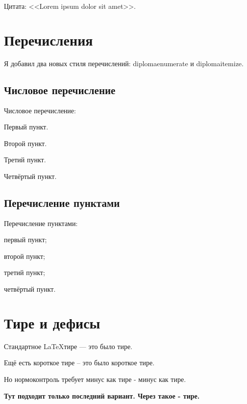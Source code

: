 Цитата: <<Lorem ipsum dolor sit amet>>.

\section{Перечисления}\label{sec:chapter_1/section_5}

Я добавил два новых стиля перечислений: diplomaenumerate и diplomaitemize.

\subsection{Числовое перечисление}\label{subsec:chapter_1/section_5/subsection_1}

Числовое перечисление:
\begin{diplomaenumerate}
    \item Первый пункт.
    \item Второй пункт.
    \item Третий пункт.
    \item Четвёртый пункт.
\end{diplomaenumerate}

\subsection{Перечисление пунктами}\label{subsec:chapter_1/section_5/subsection_2}

Перечисление пунктами:
\begin{diplomaitemize}
    \item первый пункт;
    \item второй пункт;
    \item третий пункт;
    \item четвёртый пункт.
\end{diplomaitemize}

\section{Тире и дефисы}\label{sec:chapter_1/section_6}

Стандартное \LaTeX тире --- это было тире.

Ещё есть короткое тире -- это было короткое тире.

Но нормоконтроль требует минус как тире - минус как тире.

\textbf{Тут подходит только последний вариант. Через такое - тире.}